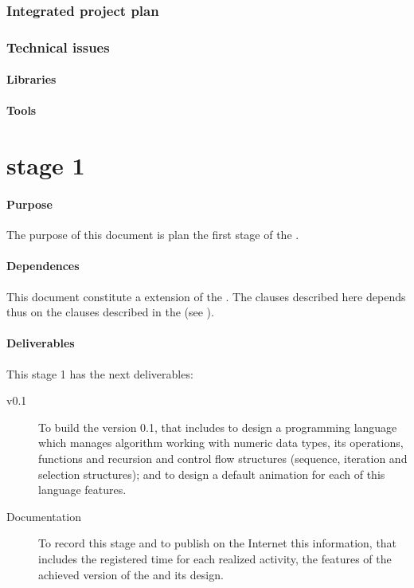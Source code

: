 \documentclass[twocolumn]{article}
\begin{document}
\section{Integrated project plan}
\label{ssec:integrated-plan}

\section{Technical issues}
\subsection{Libraries}
\subsection{Tools}

\part{\favpl stage 1}
\label{part:st1-plan}

\subsection{Purpose}
The purpose of this document is plan the first stage of the
\favp.

\subsection{Dependences}
This document constitute a extension of the \favpl. The clauses
described here depends thus on the clauses described in the \favpl
(see ).

\subsection{Deliverables}
This stage 1 has the next deliverables:

\begin{description}
\item[\fav v0.1] To build the \fav version 0.1, that includes to design a
  \fav programming language which manages algorithm working with
  numeric data types, its operations, functions and recursion and
  control flow structures (sequence, iteration and selection
  structures); and to design a default animation for each of this
  language features.
\item[Documentation] To record this stage and to publish on the
  Internet this information, that includes the registered time for
  each realized activity, the features of the achieved version of the
  \fav and its design.
\end{description}
\end{document}
